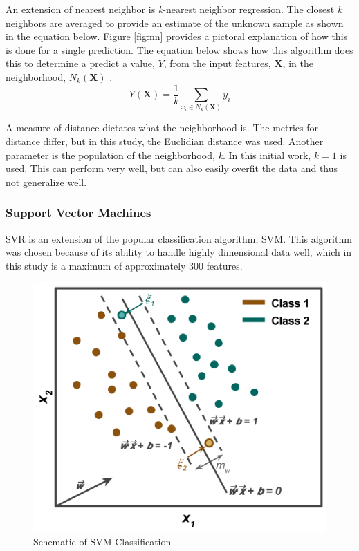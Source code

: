 An extension of nearest neighbor is \textit{k}-nearest neighbor regression.
The closest \textit{k} neighbors are averaged to provide an estimate of the
unknown sample as shown in the equation below.  Figure \ref{fig:nn} provides a
pictoral explanation of how this is done for a single prediction.  The equation
below shows how this algorithm does this to determine a predict a value, $Y$,
from the input features, $\boldsymbol{X}$, in the neighborhood, $N_k
(\boldsymbol{X})$ \cite{elements_stats}. 
\begin{equation}
  Y(\boldsymbol{X}) = \frac{1}{k} \sum_{x_i \in N_k(\boldsymbol{X})} y_i
\end{equation}

A measure of distance dictates what the neighborhood is. The metrics for
distance differ, but in this study, the Euclidian distance was used. Another
parameter is the population of the neighborhood, \textit{k}. In this initial
work, $k = 1$ is used. This can perform very well, but can also easily overfit
the data and thus not generalize well. 

\subsubsection{Support Vector Machines}
\label{sec:svm}

\Acrfull{SVR} is an extension of the popular classification algorithm, \acrfull{SVM}.
This algorithm was chosen because of its ability to handle highly dimensional
data well, which in this study is a maximum of approximately 300 features. 

\begin{figure}[!htb]
  \centering
  \includegraphics[width=0.8\linewidth]{./chapters/litrev/svm.png}
  \caption{Schematic of SVM Classification}
  \label{fig:svm}
\end{figure}

